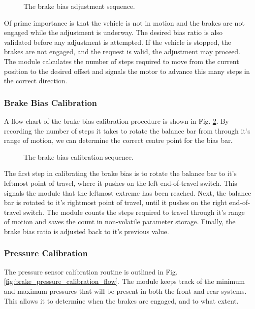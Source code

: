 \begin{figure}[H]
	\centering
	
	\caption{The brake bias adjustment sequence.}
	\label{fig:design-braking-bias-adjustment}
\end{figure}

Of prime importance is that the vehicle is not in motion and the brakes are not engaged while the adjustment is underway. The desired bias ratio is also validated before any adjustment is attempted. If the vehicle is stopped, the brakes are not engaged, and the request is valid, the adjustment may proceed. The module calculates the number of steps required to move from the current position to the desired offset and signals the motor to advance this many steps in the correct direction.

\subsubsection{Brake Bias Calibration}

A flow-chart of the brake bias calibration procedure is shown in Fig. \ref{fig:brake_bias_calibration_flow}. By recording the number of steps it takes to rotate the balance bar from through it's range of motion, we can determine the correct centre point for the bias bar. 

\begin{figure}[H]
	\centering
	
	\caption{The brake bias calibration sequence.}
	\label{fig:brake_bias_calibration_flow}
\end{figure}

The first step in calibrating the brake bias is to rotate the balance bar to it's leftmost point of travel, where it pushes on the left end-of-travel switch. This signals the module that the leftmost extreme has been reached. Next, the balance bar is rotated to it's rightmost point of travel, until it pushes on the right end-of-travel switch. The module counts the steps required to travel through it's range of motion and saves the count in non-volatile parameter storage. Finally, the brake bias ratio is adjusted back to it's previous value.

\subsubsection{Pressure Calibration}

The pressure sensor calibration routine is outlined in Fig. \ref{fig:brake_pressure_calibration_flow}. The module keeps track of the minimum and maximum pressures that will be present in both the front and rear systems. This allows it to determine when the brakes are engaged, and to what extent.

